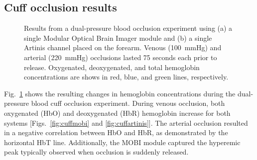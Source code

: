 \subsection{Cuff occlusion results}
\begin{figure}
	\begin{center}
	\end{center}
	\caption{Results from a dual-pressure blood occlusion experiment using (a) a single Modular Optical Brain Imager module and (b) a single Artinis channel placed on the forearm. Venous (100~mmHg) and arterial (220~mmHg) occlusions lasted 75 seconds each prior to release. Oxygenated, deoxygenated, and total hemoglobin concentrations are shows in red, blue, and green lines, respectively.} 
	\label{fig:cuff}
\end{figure} 
Fig.~\ref{fig:cuff} shows the resulting changes in hemoglobin concentrations during the dual-pressure blood cuff occlusion experiment. During venous occlusion, both oxygenated (HbO) and deoxygenated (HbR) hemoglobin increase for both systems [Figs.~\ref{fig:cuffmobi} and \ref{fig:cuffartinis}]. The arterial occlusion resulted in a negative correlation between HbO and HbR, as demonstrated by the horizontal HbT line. Additionally, the \ac{MOBI} module captured the hyperemic peak typically observed when occlusion is suddenly released. 


